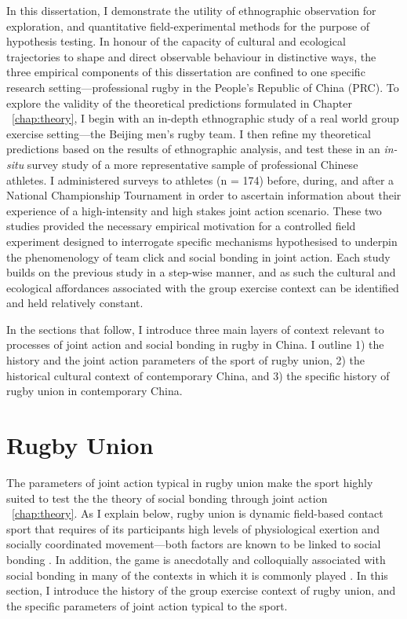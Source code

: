 \begin{CJK}{UTF8}{gbsn}
In this dissertation, I demonstrate the utility of ethnographic observation for exploration, and quantitative field-experimental methods for the purpose of hypothesis testing.  In honour of the capacity of cultural and ecological trajectories to shape and direct observable behaviour in distinctive ways, the three empirical components of this dissertation are confined to one specific research setting---professional rugby in the People's Republic of China (PRC).   To explore the validity of the theoretical predictions formulated in Chapter ~\ref{chap:theory}, I begin with an in-depth ethnographic study of a real world group exercise setting---the Beijing men's rugby team.  I then refine my theoretical predictions based on the results of ethnographic analysis, and test these in an \textit{in-situ} survey study of a more representative sample of professional Chinese athletes. I administered surveys to athletes (n = 174) before, during, and after a National Championship Tournament in order to ascertain information about their experience of a high-intensity and high stakes joint action scenario.  These two studies provided the necessary empirical motivation for a controlled field experiment designed to interrogate specific mechanisms hypothesised to underpin the phenomenology of team click and social bonding in joint action.  Each study builds on the previous study in a step-wise manner, and as such the cultural and ecological affordances associated with the group exercise context can be identified and held relatively constant.

In the sections that follow, I introduce three main layers of context relevant to processes of joint action and social bonding in rugby in China.  I outline 1) the history and the joint action parameters of the sport of rugby union, 2) the historical cultural context of contemporary China, and 3) the specific history of rugby union in contemporary China.




\section{Rugby Union}

The parameters of joint action typical in rugby union make the sport highly suited to test the the theory of social bonding through joint action ~\ref{chap:theory}.  As I explain below, rugby union is dynamic field-based contact sport that requires of its participants high levels of physiological exertion and socially coordinated movement---both factors are known to be linked to social bonding \citep{Cohen2017}. In addition, the game is anecdotally and colloquially associated with social bonding in many of the contexts in which it is commonly played \citep{Dunning2005}.  In this section, I introduce the history of the group exercise context of rugby union, and the specific parameters of joint action typical to the sport.


\end{CJK}
